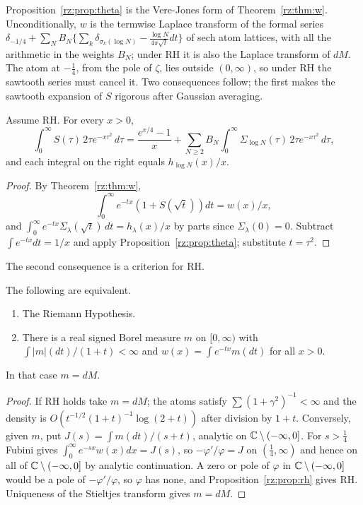 Proposition~\ref{rz:prop:theta} is the Vere-Jones form of Theorem~\ref{rz:thm:w}. Unconditionally, $w$ is the termwise Laplace transform of the formal series $\delta_{-1/4}+\sum_NB_N\{\sum_k\delta_{\sigma_k(\log N)}-\frac{\log N}{4\pi\sqrt t}dt\}$ of sech atom lattices, with all the arithmetic in the weights $B_N$; under RH it is also the Laplace transform of $dM$. The atom at $-\frac14$, from the pole of $\zeta$, lies outside $(0,\infty)$, so under RH the sawtooth series must cancel it. Two consequences follow; the first makes the sawtooth expansion of $S$ rigorous after Gaussian averaging.

\begin{corollary}\label{rz:cor:Ssaw}
Assume RH. For every $x>0$,
\[
\int_0^\infty S(\tau)\,2\tau e^{-x\tau^2}\,d\tau=\frac{e^{x/4}-1}{x}+\sum_{N\ge2}B_N\int_0^\infty\Sigma_{\log N}(\tau)\,2\tau e^{-x\tau^2}\,d\tau,
\]
and each integral on the right equals $h_{\log N}(x)/x$.
\end{corollary}

\begin{proof}
By Theorem~\ref{rz:thm:w},
\[
\int_0^\infty e^{-tx}(1+S(\sqrt t))dt=w(x)/x,
\]
and $\int_0^\infty e^{-tx}\Sigma_\lambda(\sqrt t)\,dt=h_\lambda(x)/x$ by parts since $\Sigma_\lambda(0)=0$. Subtract $\int e^{-tx}dt=1/x$ and apply Proposition~\ref{rz:prop:theta}; substitute $t=\tau^2$.
\end{proof}

The second consequence is a criterion for RH.

\begin{theorem}\label{rz:thm:crit}
The following are equivalent.
\begin{enumerate}
\item[(i)] The Riemann Hypothesis.
\item[(ii)] There is a real signed Borel measure $m$ on $[0,\infty)$ with $\int|m|(dt)/(1+t)<\infty$ and $w(x)=\int e^{-tx}m(dt)$ for all $x>0$.
\end{enumerate}
In that case $m=dM$.
\end{theorem}

\begin{proof}
If RH holds take $m=dM$; the atoms satisfy $\sum(1+\gamma^2)^{-1}<\infty$ and the density is $O(t^{-1/2}(1+t)^{-1}\log(2+t))$ after division by $1+t$. Conversely, given $m$, put $J(s)=\int m(dt)/(s+t)$, analytic on $\mathbb{C}\setminus(-\infty,0]$. For $s>\frac14$ Fubini gives $\int_0^\infty e^{-sx}w(x)dx=J(s)$, so $-\varphi'/\varphi=J$ on $(\frac14,\infty)$ and hence on all of $\mathbb{C}\setminus(-\infty,0]$ by analytic continuation. A zero or pole of $\varphi$ in $\mathbb{C}\setminus(-\infty,0]$ would be a pole of $-\varphi'/\varphi$, so $\varphi$ has none, and Proposition~\ref{rz:prop:rh} gives RH. Uniqueness of the Stieltjes transform gives $m=dM$.
\end{proof}



